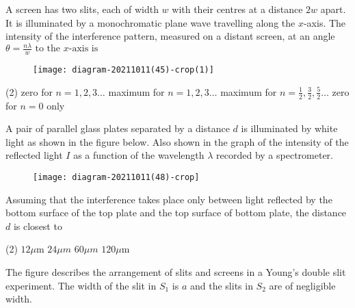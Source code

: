 \begin{enumerate}
\begin{tasks}
\end{tasks}
\begin{minipage}{\textwidth}
	\item A screen has two slits, each of width $w$ with their centres at a distance $2 w$ apart. It is illuminated by a monochromatic plane wave travelling along the $x$-axis.
	The intensity of the interference pattern, measured on a distant screen, at an angle
	$\theta=\frac{n \lambda}{w} \text { to the } x \text {-axis is }$
	\begin{figure}[H]
		\centering
		\texttt{[image: diagram-20211011(45)-crop(1)]}
		\caption{}
		\label{}
	\end{figure}
\end{minipage}
\begin{tasks}(2)
	\task[\textbf{A.}] zero for $n=1,2,3 \ldots$ 
	\task[\textbf{B.}]maximum for $n=1,2,3 \ldots$
	\task[\textbf{C.}]maximum for $n=\frac{1}{2}, \frac{3}{2}, \frac{5}{2} \ldots$
	\task[\textbf{D.}]zero for $n=0$ only
\end{tasks}
\begin{minipage}{\textwidth}
	\item A pair of parallel glass plates separated by a distance $d$ is illuminated by white light as shown in the figure below. Also shown in the graph of the intensity of the reflected light $I$ as a function of the wavelength $\lambda$ recorded by a spectrometer.
	\begin{figure}[H]
		\centering
		\texttt{[image: diagram-20211011(48)-crop]}
	\end{figure}
	Assuming that the interference takes place only between light reflected by the bottom surface of the top plate and the top surface of bottom plate, the distance $d$ is closest to
\end{minipage}
\begin{tasks}(2)
	\task[\textbf{A.}] $12 \mu \mathrm{m}$
	\task[\textbf{B.}] $24 \mu m$
	\task[\textbf{C.}] $60 \mu m$
	\task[\textbf{D.}] $120 \mu \mathrm{m}$
\end{tasks}
\begin{minipage}{\textwidth}
	\item The figure describes the arrangement of slits and screens in a Young's double slit experiment. The width of the slit in $S_{1}$ is $a$ and the slits in $S_{2}$ are of negligible width.
	

\end{minipage}
\end{enumerate}

